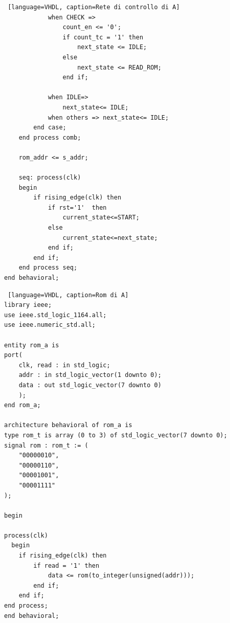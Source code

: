 \begin{lstlisting} [language=VHDL, caption=Rete di controllo di A]
            when CHECK =>
                count_en <= '0';
                if count_tc = '1' then
                    next_state <= IDLE;
                else
                    next_state <= READ_ROM;
                end if;

            when IDLE=>
                next_state<= IDLE;
            when others => next_state<= IDLE;
        end case;
    end process comb;

    rom_addr <= s_addr;

    seq: process(clk)
    begin
        if rising_edge(clk) then
            if rst='1'  then
                current_state<=START;
            else
                current_state<=next_state;
            end if;
        end if;
    end process seq;
end behavioral;
\end{lstlisting}

\begin{lstlisting} [language=VHDL, caption=Rom di A]
library ieee;
use ieee.std_logic_1164.all;
use ieee.numeric_std.all;

entity rom_a is
port(
    clk, read : in std_logic; 
    addr : in std_logic_vector(1 downto 0);
    data : out std_logic_vector(7 downto 0)
    );
end rom_a;

architecture behavioral of rom_a is 
type rom_t is array (0 to 3) of std_logic_vector(7 downto 0);
signal rom : rom_t := (
    "00000010", 
    "00000110", 
    "00001001", 
    "00001111"
);

begin

process(clk)
  begin
    if rising_edge(clk) then
        if read = '1' then
            data <= rom(to_integer(unsigned(addr)));
        end if;
    end if;
end process;
end behavioral;
\end{lstlisting}

